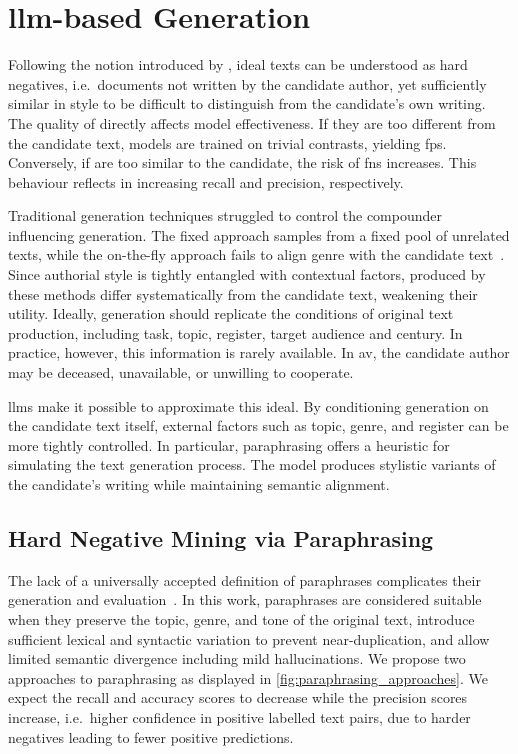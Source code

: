 \section{\acs{llm}-based \Imp{} Generation}
\label{sec:impostor_generation}

Following the notion introduced by \citet{koppel_determining_2014}, ideal \imp{} texts can be understood as hard negatives, i.e.\ documents not written by the candidate author, yet sufficiently similar in style to be difficult to distinguish from the candidate's own writing. 
The quality of \imps{} directly affects model effectiveness.
If they are too different from the candidate text, models are trained on trivial contrasts, yielding \acp{fp}. 
Conversely, if \imps{} are too similar to the candidate, the risk of \acp{fn} increases.
This behaviour reflects in increasing recall and precision, respectively.

Traditional \imp{} generation techniques struggled to control the compounder influencing \imp{} generation. 
The fixed approach samples from a fixed pool of unrelated texts, while the on-the-fly approach fails to align genre with the candidate text~\citep{koppel_determining_2014}. 
Since authorial style is tightly entangled with contextual factors, \imps{} produced by these methods differ systematically from the candidate text, weakening their utility. 
Ideally, \imp{} generation should replicate the conditions of original text production, including task, topic, register, target audience and century. 
In practice, however, this information is rarely available.
In \ac{av}, the candidate author may be deceased, unavailable, or unwilling to cooperate.

\acp{llm} make it possible to approximate this ideal. 
By conditioning generation on the candidate text itself, external factors such as topic, genre, and register can be more tightly controlled. 
In particular, paraphrasing offers a heuristic for simulating the text generation process. 
The model produces stylistic variants of the candidate's writing while maintaining semantic alignment.


\subsection{Hard Negative Mining via Paraphrasing}

The lack of a universally accepted definition of paraphrases complicates their generation and evaluation~\citep{gohsen_task_oriented_2024}. 
In this work, paraphrases are considered suitable \imps{} when they preserve the topic, genre, and tone of the original text, introduce sufficient lexical and syntactic variation to prevent near-duplication, and allow limited semantic divergence including mild hallucinations.
We propose two approaches to paraphrasing as displayed in \autoref{fig:paraphrasing_approaches}.
We expect the \impAppr{} recall and accuracy scores to decrease while the precision scores increase, i.e.\ higher confidence in positive labelled text pairs, due to harder negatives leading to fewer positive predictions.

